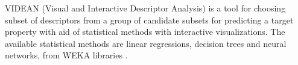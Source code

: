 VIDEAN (Visual and Interactive Descriptor Analysis) is a tool for choosing subset of descriptors from a group of candidate subsets for predicting a target property with aid of statistical methods with interactive visualizations. The available statistical methods are linear regressions, decision trees and neural networks, from WEKA libraries \cite{Mart_nez_2015}.